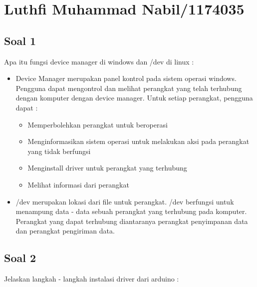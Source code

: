 \section{Luthfi Muhammad Nabil/1174035}
\subsection{Soal 1}
Apa itu fungsi device manager di windows dan /dev di linux :
\begin{itemize}
	\item Device Manager merupakan panel kontrol pada sistem operasi windows. Pengguna dapat mengontrol dan melihat perangkat yang  telah terhubung dengan komputer dengan device manager. 
	Untuk setiap perangkat, pengguna dapat : 
		\begin{itemize}
			\item Memperbolehkan perangkat untuk beroperasi
			\item Menginformasikan sistem operasi untuk melakukan aksi pada perangkat yang tidak berfungsi
			\item Menginstall driver untuk perangkat yang terhubung
			\item Melihat informasi dari perangkat
		\end{itemize}
	\item /dev merupakan lokasi dari file untuk perangkat. /dev berfungsi untuk menampung data - data sebuah perangkat yang terhubung pada komputer. Perangkat yang dapat terhubung diantaranya perangkat penyimpanan data dan perangkat pengiriman data.
\end{itemize}

\subsection{Soal 2}
Jelaskan langkah - langkah instalasi driver dari arduino : 

